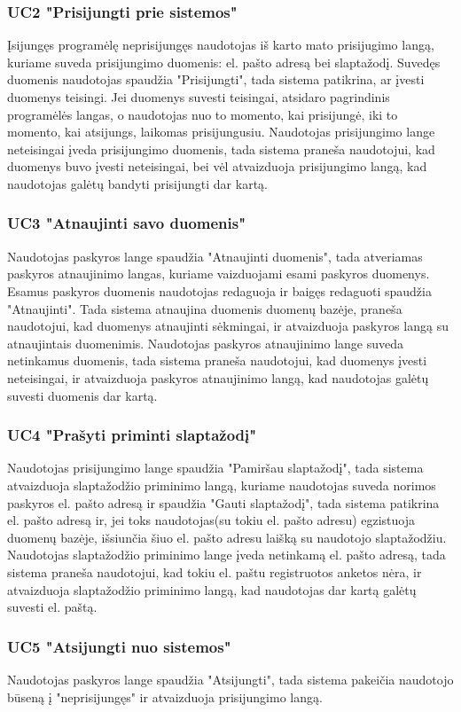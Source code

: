 \documentclass{VUMIFPSbakalaurinis}
\begin{document}
\subsubsection{UC2 "Prisijungti prie sistemos"}
Įsijungęs programėlę neprisijungęs naudotojas iš karto mato prisijugimo langą, kuriame suveda prisijungimo duomenis: el. pašto adresą bei slaptažodį. Suvedęs duomenis naudotojas spaudžia "Prisijungti", tada sistema patikrina, ar įvesti duomenys teisingi. Jei duomenys suvesti teisingai, atsidaro pagrindinis programėlės langas, o naudotojas nuo to momento, kai prisijungė, iki to momento, kai atsijungs, laikomas prisijungusiu.
Naudotojas prisijungimo lange neteisingai įveda prisijungimo duomenis, tada sistema praneša naudotojui, kad duomenys buvo įvesti neteisingai, bei vėl atvaizduoja prisijungimo langą, kad naudotojas galėtų bandyti prisijungti dar kartą.
\subsubsection{UC3 "Atnaujinti savo duomenis"}
Naudotojas paskyros lange spaudžia "Atnaujinti duomenis", tada atveriamas paskyros atnaujinimo langas, kuriame vaizduojami esami paskyros duomenys. Esamus paskyros duomenis naudotojas redaguoja ir baigęs redaguoti spaudžia "Atnaujinti". Tada sistema atnaujina duomenis duomenų bazėje, praneša naudotojui, kad duomenys atnaujinti sėkmingai, ir atvaizduoja paskyros langą su atnaujintais duomenimis.
Naudotojas paskyros atnaujinimo lange suveda netinkamus duomenis, tada sistema praneša naudotojui, kad duomenys įvesti neteisingai, ir atvaizduoja paskyros atnaujinimo langą, kad naudotojas galėtų suvesti duomenis dar kartą.
\subsubsection{UC4 "Prašyti priminti slaptažodį"}
Naudotojas prisijungimo lange spaudžia "Pamiršau slaptažodį", tada sistema atvaizduoja slaptažodžio priminimo langą, kuriame naudotojas suveda norimos paskyros el. pašto adresą ir spaudžia "Gauti slaptažodį", tada sistema patikrina el. pašto adresą ir, jei toks naudotojas(su tokiu el. pašto adresu) egzistuoja duomenų bazėje, išsiunčia šiuo el. pašto adresu laišką su naudotojo slaptažodžiu.
Naudotojas slaptažodžio priminimo lange įveda netinkamą el. pašto adresą, tada sistema praneša naudotojui, kad tokiu el. paštu registruotos anketos nėra, ir atvaizduoja slaptažodžio priminimo langą, kad naudotojas dar kartą galėtų suvesti el. paštą.
\subsubsection{UC5 "Atsijungti nuo sistemos"}
Naudotojas paskyros lange spaudžia "Atsijungti", tada sistema pakeičia naudotojo būseną į "neprisijungęs" ir atvaizduoja prisijungimo langą.
\end{document}
